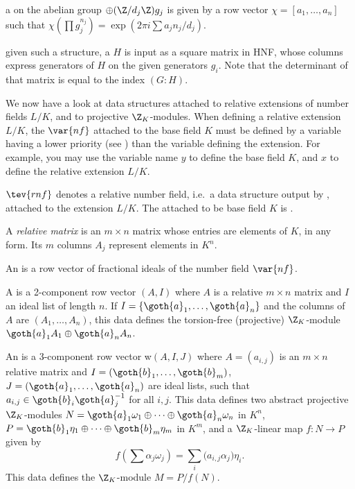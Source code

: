 \item a  on the abelian group
$\oplus (\Z/d_j\Z) g_j$
is given by a row vector $\chi = [a_1,\ldots,a_n]$ such that
$\chi(\prod g_j^{n_j}) = \exp(2\pi i\sum a_j n_j / d_j)$.

\item given such a structure, a  $H$ is input as a square
matrix in HNF, whose columns express generators of $H$ on the given generators
$g_i$. Note that the determinant of that matrix is equal to the index $(G:H)$.


We now have a look at data structures attached to relative extensions
of number fields $L/K$, and to projective $\Z_K$-modules. When defining a
relative extension $L/K$, the $\var{nf}$ attached to the base field $K$
must be defined by a variable having a lower priority (see
) than the variable defining the extension. For example,
you may use the variable name $y$ to define the base field $K$, and $x$ to
define the relative extension $L/K$.

\label{se:ZKmodules} %

\item $\tev{rnf}$ denotes a relative number field, i.e.~a data structure
output by , attached to the extension $L/K$. The 
attached to be base field $K$ is .

\item A \emph{relative matrix} is an $m\times n$ matrix whose entries are
elements of $K$, in any form. Its $m$ columns $A_j$ represent elements
in $K^n$.

\item An  is a row vector of fractional ideals of the number
field $\var{nf}$.

\item A  is a 2-component row vector $(A,I)$ where $A$
is a relative $m\times n$ matrix and $I$ an ideal list of length $n$. If $I =
\{\goth{a}_1,\dots, \goth{a}_n\}$ and the columns of $A$ are $(A_1,\dots,
A_n)$, this data defines the torsion-free (projective) $\Z_K$-module
$\goth{a}_1 A_1\oplus \goth{a}_n A_n$.

\item An  is a 3-component row vector w$(A,I,J)$
where $A = (a_{i,j})$ is an $m\times n$ relative matrix and $I =
(\goth{b}_1,\dots, \goth{b}_m)$, $J = (\goth{a}_1,\dots, \goth{a}_n)$ are ideal
lists, such that $a_{i,j} \in \goth{b}_i \goth{a}_j^{-1}$ for all $i,j$. This
data defines two abstract projective $\Z_K$-modules
$N = \goth{a}_1\omega_1\oplus \cdots\oplus \goth{a}_n\omega_n $ in $K^n$,
$P = \goth{b}_1\eta_1\oplus \cdots\oplus \goth{b}_m\eta_m$ in $K^m$, and a
$\Z_K$-linear map $f:N\to P$ given by
$$ f(\sum \alpha_j\omega_j) = \sum_i \Big(a_{i,j}\alpha_j\Big) \eta_i.$$
This data defines the $\Z_K$-module $M = P/f(N)$.

